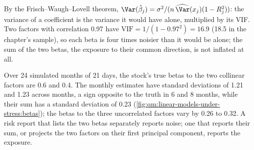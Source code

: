 By the Frisch--Waugh--Lovell theorem, $\Var(\hat\beta_j) = \sigma^2/(n\,\widehat{\Var}(x_j)(1 - R_j^2))$: the variance of a coefficient is the
variance it would have alone, multiplied by its VIF. Two factors with correlation 0.97 have $\mathrm{VIF} = 1/(1 - 0.97^2) = 16.9$ (18.5 in
the chapter's sample), so each beta is four times noisier than it would be alone; the sum of the two betas, the exposure to their common
direction, is not inflated at all.

Over 24 simulated months of 21 days, the stock's true betas to the two collinear factors are 0.6 and 0.4. The monthly estimates have standard
deviations of 1.21 and 1.23 across months, a sign opposite to the truth in 6 and 8 months, while their sum has a standard deviation of 0.23
(\cref{fig:qm:linear-models-under-stress:betas}); the betas to the three uncorrelated factors vary by 0.26 to 0.32. A risk report that lists
the two betas separately reports noise; one that reports their sum, or projects the two factors on their first principal component,
reports the exposure.

\begin{omfigure}

\label{fig:qm:linear-models-under-stress:betas}
\end{omfigure}

